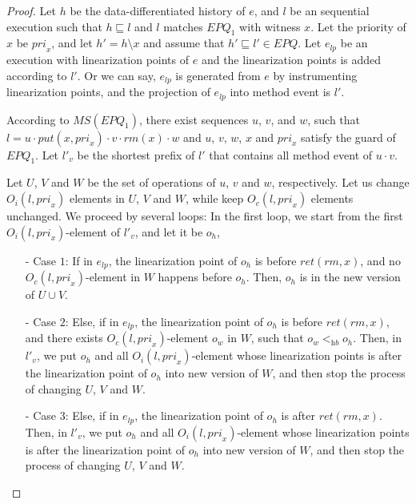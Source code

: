 \begin {proof}
Let $h$ be the data-differentiated history of $e$, and $l$ be an sequential execution such that $h \sqsubseteq l$ and $l$ matches $\textit{EPQ}_1$ with witness $x$. Let the priority of $x$ be $\textit{pri}_x$, and let $h'=h \setminus x$ and assume that $h' \sqsubseteq l' \in \textit{EPQ}$. Let $e_{\textit{lp}}$ be an execution with linearization points of $e$ and the linearization points is added according to $l'$. Or we can say, $e_{\textit{lp}}$ is generated from $e$ by instrumenting linearization points, and the projection of $e_{\textit{lp}}$ into method event is $l'$.

According to $\textit{MS}(\textit{EPQ}_1)$, there exist sequences $u$, $v$, and $w$, such that $l=u \cdot \textit{put}(x,\textit{pri}_x) \cdot v \cdot \textit{rm}(x) \cdot w$ and $u$, $v$, $w$, $x$ and $\textit{pri}_x$ satisfy the guard of $\textit{EPQ}_1$. Let $l'_v$ be the shortest prefix of $l'$ that contains all method event of $u \cdot v$.

Let $U$, $V$ and $W$ be the set of operations of $u$, $v$ and $w$, respectively. Let us change $O_i(l,\textit{pri}_x)$ elements in $U$, $V$ and $W$, while keep $O_c(l,\textit{pri}_x)$ elements unchanged. We proceed by several loops: In the first loop, we start from the first $O_i(l,\textit{pri}_x)$-element of $l'_v$, and let it be $o_h$,

\begin{itemize}
\setlength{\itemsep}{0.5pt}
\item[-] Case $1$: If in $e_{\textit{lp}}$, the linearization point of $o_h$ is before $\textit{ret}(\textit{rm},x)$, and no $O_c(l,\textit{pri}_x)$-element in $W$ happens before $o_h$. Then, $o_h$ is in the new version of $U \cup V$.

\item[-] Case $2$: Else, if in $e_{\textit{lp}}$, the linearization point of $o_h$ is before $\textit{ret}(\textit{rm},x)$, and there exists $O_c(l,\textit{pri}_x)$-element $o_w$ in $W$, such that $o_w <_{\textit{hb}} o_h$. Then, in $l'_v$, we put $o_h$ and all $O_i(l,\textit{pri}_x)$-element whose linearization points is after the linearization point of $o_h$ into new version of $W$, and then stop the process of changing $U$, $V$ and $W$.

\item[-] Case $3$: Else, if in $e_{\textit{lp}}$, the linearization point of $o_h$ is after $\textit{ret}(\textit{rm},x)$. Then, in $l'_v$, we put $o_h$ and all $O_i(l,\textit{pri}_x)$-element whose linearization points is after the linearization point of $o_h$ into new version of $W$, and then stop the process of changing $U$, $V$ and $W$.
\end{itemize}


\end{proof}
